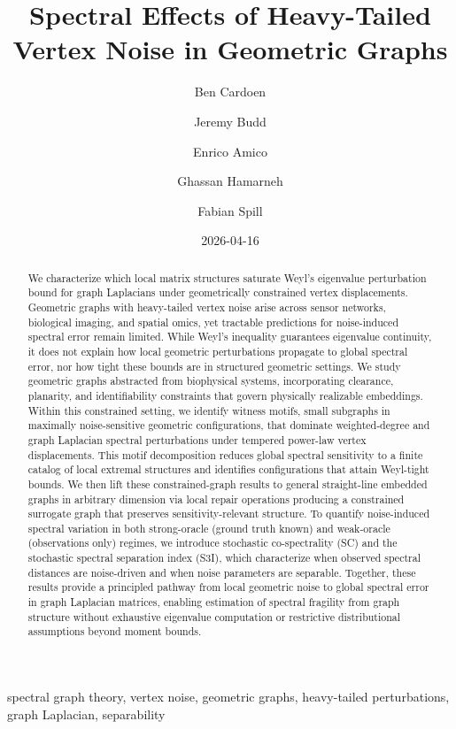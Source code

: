 \documentclass[
  11pt,
  letterpaper]{siamart251216}
\title{Spectral Effects of Heavy-Tailed Vertex Noise in Geometric
Graphs}
\author{Ben Cardoen \and Jeremy Budd \and Enrico Amico \and Ghassan
Hamarneh \and Fabian Spill}
\date{2026-04-16}
\begin{document}
\maketitle
\begin{abstract}
We characterize which local matrix structures saturate Weyl's eigenvalue
perturbation bound for graph Laplacians under geometrically constrained
vertex displacements. Geometric graphs with heavy-tailed vertex noise
arise across sensor networks, biological imaging, and spatial omics, yet
tractable predictions for noise-induced spectral error remain limited.
While Weyl's inequality guarantees eigenvalue continuity, it does not
explain how local geometric perturbations propagate to global spectral
error, nor how tight these bounds are in structured geometric settings.
We study geometric graphs abstracted from biophysical systems,
incorporating clearance, planarity, and identifiability constraints that
govern physically realizable embeddings. Within this constrained
setting, we identify witness motifs, small subgraphs in maximally
noise-sensitive geometric configurations, that dominate weighted-degree
and graph Laplacian spectral perturbations under tempered power-law
vertex displacements. This motif decomposition reduces global spectral
sensitivity to a finite catalog of local extremal structures and
identifies configurations that attain Weyl-tight bounds. We then lift
these constrained-graph results to general straight-line embedded graphs
in arbitrary dimension via local repair operations producing a
constrained surrogate graph that preserves sensitivity-relevant
structure. To quantify noise-induced spectral variation in both
strong-oracle (ground truth known) and weak-oracle (observations only)
regimes, we introduce stochastic co-spectrality (SC) and the stochastic
spectral separation index (S3I), which characterize when observed
spectral distances are noise-driven and when noise parameters are
separable. Together, these results provide a principled pathway from
local geometric noise to global spectral error in graph Laplacian
matrices, enabling estimation of spectral fragility from graph structure
without exhaustive eigenvalue computation or restrictive distributional
assumptions beyond moment bounds.
\end{abstract}


\begin{keywords}
spectral graph theory, vertex noise, geometric graphs, heavy-tailed perturbations, graph Laplacian, separability
\end{keywords}
\end{document}

